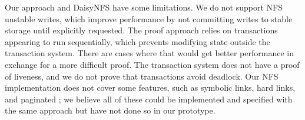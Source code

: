 Our approach and DaisyNFS have some limitations. We do not support NFS unstable
writes, which improve performance by not committing writes to stable storage
until explicitly requested. The proof approach relies on transactions appearing
to run sequentially, which prevents modifying state
outside the transaction system.
There are cases where that would get better performance in exchange for a more
difficult proof. The transaction system does not have a proof of liveness, and
we do not prove that transactions avoid deadlock. Our NFS implementation does
not cover some features, such as symbolic links, hard links, and paginated
; we believe all of these could be implemented and specified with
the same approach but have not done so in our prototype.
